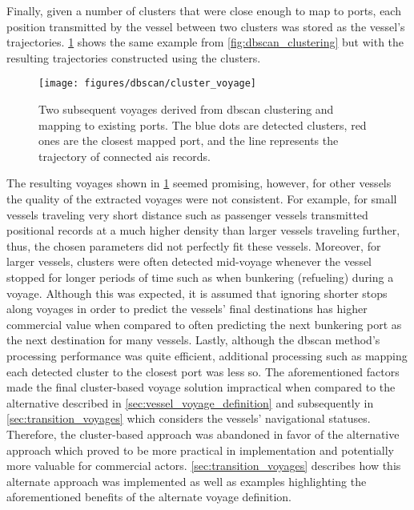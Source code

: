 Finally, given a number of clusters that were close enough to map to ports, each position transmitted by the vessel between two clusters was stored as the vessel's trajectories. \cref{fig:clustered_trajectories} shows the same example from \cref{fig:dbscan_clustering} but with the resulting trajectories constructed using the clusters.

\begin{figure}[htbp]
    \centering
    \texttt{[image: figures/dbscan/cluster\_voyage]}
    \caption{Two subsequent voyages derived from \acrshort{dbscan} clustering and mapping to existing ports. The blue dots are detected clusters, red ones are the closest mapped port, and the line represents the trajectory of connected \acrshort{ais} records.}
    \label{fig:clustered_trajectories}
\end{figure}

The resulting voyages shown in \cref{fig:clustered_trajectories} seemed promising, however, for other vessels the quality of the extracted voyages were not consistent. For example, for small vessels traveling very short distance such as passenger vessels transmitted positional records at a much higher density than larger vessels traveling further, thus, the chosen parameters did not perfectly fit these vessels. Moreover, for larger vessels, clusters were often detected mid-voyage whenever the vessel stopped for longer periods of time such as when bunkering (refueling) during a voyage. Although this was expected, it is assumed that ignoring shorter stops along voyages in order to predict the vessels' final destinations has higher commercial value when compared to often predicting the next bunkering port as the next destination for many vessels. Lastly, although the \acrshort{dbscan} method's processing performance was quite efficient, additional processing such as mapping each detected cluster to the closest port was less so. The aforementioned factors made the final cluster-based voyage solution impractical when compared to the alternative described in \cref{sec:vessel_voyage_definition} and subsequently in \cref{sec:transition_voyages} which considers the vessels' navigational statuses. Therefore, the cluster-based approach was abandoned in favor of the alternative approach which proved to be more practical in implementation and potentially more valuable for commercial actors. \cref{sec:transition_voyages} describes how this alternate approach was implemented as well as examples highlighting the aforementioned benefits of the alternate voyage definition.

